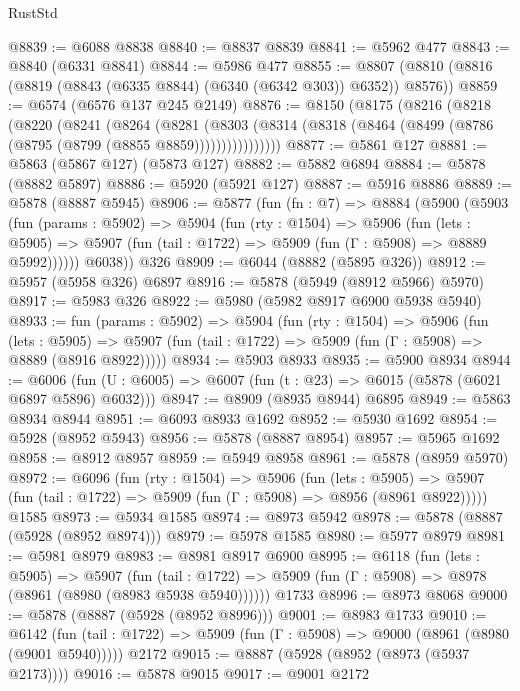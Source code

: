 \begin{lexlean}{RustStd}
\begin{coremodule}
@8839 := @6088 @8838
@8840 := @8837 @8839
@8841 := @5962 @477
@8843 := @8840 (@6331 @8841)
@8844 := @5986 @477
@8855 := @8807 (@8810 (@8816 (@8819 (@8843 (@6335 @8844) (@6340 (@6342 @303)) @6352)) @8576))
@8859 := @6574 (@6576 @137 @245 @2149)
@8876 := @8150
    (@8175
      (@8216
        (@8218
          (@8220
            (@8241
              (@8264
                (@8281
                  (@8303
                    (@8314 (@8318 (@8464 (@8499 (@8786 (@8795 (@8799 (@8855 @8859))))))))))))))))
@8877 := @5861 @127
@8881 := @5863 (@5867 @127) (@5873 @127)
@8882 := @5882 @6894
@8884 := @5878 (@8882 @5897)
@8886 := @5920 (@5921 @127)
@8887 := @5916 @8886
@8889 := @5878 (@8887 @5945)
@8906 := @5877
    (fun (fn : @7) =>
    @8884
      (@5900
        (@5903
          (fun (params : @5902) =>
          @5904
            (fun (rty : @1504) =>
            @5906
              (fun (lets : @5905) =>
              @5907 (fun (tail : @1722) => @5909 (fun (Γ : @5908) => @8889 @5992))))))
        @6038))
    @326
@8909 := @6044 (@8882 (@5895 @326))
@8912 := @5957 (@5958 @326) @6897
@8916 := @5878 (@5949 (@8912 @5966) @5970)
@8917 := @5983 @326
@8922 := @5980 (@5982 @8917 @6900 @5938 @5940)
@8933 := fun (params : @5902) =>
  @5904
    (fun (rty : @1504) =>
    @5906
      (fun (lets : @5905) =>
      @5907 (fun (tail : @1722) => @5909 (fun (Γ : @5908) => @8889 (@8916 @8922)))))
@8934 := @5903 @8933
@8935 := @5900 @8934
@8944 := @6006 (fun (U : @6005) => @6007 (fun (t : @23) => @6015 (@5878 (@6021 @6897 @5896) @6032)))
@8947 := @8909 (@8935 @8944) @6895
@8949 := @5863 @8934 @8944
@8951 := @6093 @8933 @1692
@8952 := @5930 @1692
@8954 := @5928 (@8952 @5943)
@8956 := @5878 (@8887 @8954)
@8957 := @5965 @1692
@8958 := @8912 @8957
@8959 := @5949 @8958
@8961 := @5878 (@8959 @5970)
@8972 := @6096
    (fun (rty : @1504) =>
    @5906
      (fun (lets : @5905) =>
      @5907 (fun (tail : @1722) => @5909 (fun (Γ : @5908) => @8956 (@8961 @8922)))))
    @1585
@8973 := @5934 @1585
@8974 := @8973 @5942
@8978 := @5878 (@8887 (@5928 (@8952 @8974)))
@8979 := @5978 @1585
@8980 := @5977 @8979
@8981 := @5981 @8979
@8983 := @8981 @8917 @6900
@8995 := @6118
    (fun (lets : @5905) =>
    @5907
      (fun (tail : @1722) => @5909 (fun (Γ : @5908) => @8978 (@8961 (@8980 (@8983 @5938 @5940))))))
    @1733
@8996 := @8973 @8068
@9000 := @5878 (@8887 (@5928 (@8952 @8996)))
@9001 := @8983 @1733
@9010 := @6142
    (fun (tail : @1722) => @5909 (fun (Γ : @5908) => @9000 (@8961 (@8980 (@9001 @5940)))))
    @2172
@9015 := @8887 (@5928 (@8952 (@8973 (@5937 @2173))))
@9016 := @5878 @9015
@9017 := @9001 @2172

\end{coremodule}
\end{lexlean}
